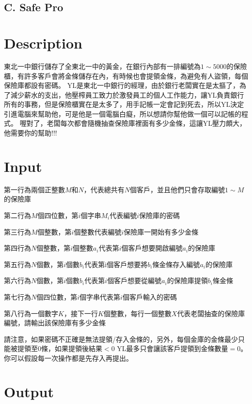 \documentclass[11pt,a4paper]{article}
\begin{document}
\begin{center}
\section*{C. Safe Pro}
\end{center}

\section*{Description}


東北一中銀行儲存了全東北一中的黃金，在銀行內部有一排編號為$1\sim 5000$的保險櫃，有許多客戶會將金條儲存在內，有時候也會提領金條，為避免有人盜領，每個保險庫都設有密碼。
YL是東北一中銀行的經理，由於銀行老闆實在是太摳了，為了減少薪水的支出，他壓榨員工致力於激發員工的個人工作能力，讓YL負責銀行所有的事務，但是保險櫃實在是太多了，用手記帳一定會記到死去，所以YL決定引進電腦來幫助他，可是他是一個電腦白癡，所以想請你幫他做一個可以記帳的程式。
喔對了，老闆每次都會隨機抽查保險庫裡面有多少金條，這讓YL壓力頗大，他需要你的幫助!!!


\section*{Input}

第一行為兩個正整數$M$和$N$，代表總共有$N$個客戶，並且他們只會存取編號$1\sim M$的保險庫

第二行為$M$個四位數，第$i$個字串$M_i$代表編號$i$保險庫的密碼

第三行為$M$個整數，第$i$個整數代表編號$i$保險庫一開始有多少金條

第四行為$N$個整數，第$i$個整數$a_i$代表第$i$個客戶想要開啟編號$a_i$的保險庫

第五行為$N$個數，第$i$個數$b_i$代表第i個客戶想要將$b_i$條金條存入編號$a_i$的保險庫

第六行為$N$個數，第$i$個數$b_i$代表第$i$個客戶想要從編號$a_i$的保險庫提領$b_i$條金條

第七行為$N$個四位數，第$i$個字串代表第$i$個客戶輸入的密碼

第八行為一個數字$K$，接下一行$K$個整數，每行一個整數$X$代表老闆抽查的保險庫編號，請輸出該保險庫有多少金條

請注意，如果密碼不正確是無法提領/存入金條的，另外，每個金庫的金條最少只能被提領至$0$條，如果提領後結果$<0$ YL最多只會讓該客戶提領到金條數量$=0$。你可以假設每一次操作都是先存入再提出。


\section*{Output}
\end{document}
